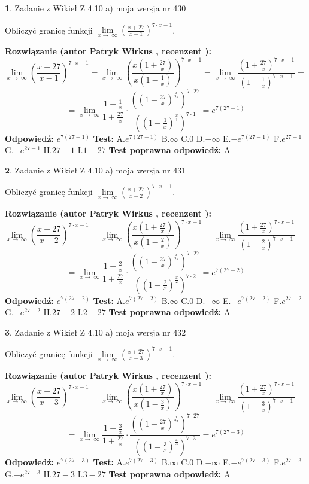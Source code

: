 \documentclass[12pt, a4paper]{article}
\theoremstyle{definition} %
\newtheorem{zad}{}
\newcommand{\zadStart}[1]{\begin{zad}#1\newline}
\newcommand{\zadStop}{\end{zad}}
\newcommand{\rozwStart}[2]{\noindent \textbf{Rozwiązanie (autor #1 , recenzent #2): }\newline}
\newcommand{\rozwStop}{\newline}
\newcommand{\odpStart}{\noindent \textbf{Odpowiedź:}\newline}
\newcommand{\odpStop}{\newline}
\newcommand{\testStart}{\noindent \textbf{Test:}\newline}
\newcommand{\testStop}{\newline}
\newcommand{\kluczStart}{\noindent \textbf{Test poprawna odpowiedź:}\newline}
\newcommand{\kluczStop}{\newline}
\begin{document}
\zadStart{Zadanie z Wikieł Z 4.10 a) moja wersja nr 430}


Obliczyć granicę funkcji  $\lim\limits_{x\to\ \infty}(\frac{x+27}{x-1})^{7\cdot x-1}$.
\zadStop
\rozwStart{Patryk Wirkus}{}
$$\lim\limits_{x\to\ \infty}(\frac{x+27}{x-1})^{7\cdot x-1} = \lim\limits_{x\to\ \infty}(\frac{x(1+\frac{27}{x})}{x(1-\frac{1}{x})})^{7\cdot x-1}=\lim\limits_{x\to\ \infty}\frac{(1+\frac{27}{x})^{7\cdot x-1}}{(1-\frac{1}{x})^{7\cdot x-1}}=$$
$$=\lim\limits_{x\to\ \infty}\frac{1-\frac{1}{x}}{1+\frac{27}{x}}\cdot\frac{((1+\frac{27}{x})^{\frac{x}{27}})^{7\cdot27}}{((1-\frac{1}{x})^{\frac{x}{1}})^{7\cdot1}}=e^{7(27-1)}$$
\rozwStop
\odpStart
$e^{7(27-1)}$
\odpStop
\testStart
A.$e^{7(27-1)}$ B.$\infty$ C.$0$ D.$-\infty$ E.$-e^{7(27-1)}$
F.$e^{27-1}$ G.$-e^{27-1}$
H.$27-1$
I.$1-27$
\testStop
\kluczStart
A
\kluczStop



\zadStart{Zadanie z Wikieł Z 4.10 a) moja wersja nr 431}


Obliczyć granicę funkcji  $\lim\limits_{x\to\ \infty}(\frac{x+27}{x-2})^{7\cdot x-1}$.
\zadStop
\rozwStart{Patryk Wirkus}{}
$$\lim\limits_{x\to\ \infty}(\frac{x+27}{x-2})^{7\cdot x-1} = \lim\limits_{x\to\ \infty}(\frac{x(1+\frac{27}{x})}{x(1-\frac{2}{x})})^{7\cdot x-1}=\lim\limits_{x\to\ \infty}\frac{(1+\frac{27}{x})^{7\cdot x-1}}{(1-\frac{2}{x})^{7\cdot x-1}}=$$
$$=\lim\limits_{x\to\ \infty}\frac{1-\frac{2}{x}}{1+\frac{27}{x}}\cdot\frac{((1+\frac{27}{x})^{\frac{x}{27}})^{7\cdot27}}{((1-\frac{2}{x})^{\frac{x}{2}})^{7\cdot2}}=e^{7(27-2)}$$
\rozwStop
\odpStart
$e^{7(27-2)}$
\odpStop
\testStart
A.$e^{7(27-2)}$ B.$\infty$ C.$0$ D.$-\infty$ E.$-e^{7(27-2)}$
F.$e^{27-2}$ G.$-e^{27-2}$
H.$27-2$
I.$2-27$
\testStop
\kluczStart
A
\kluczStop



\zadStart{Zadanie z Wikieł Z 4.10 a) moja wersja nr 432}


Obliczyć granicę funkcji  $\lim\limits_{x\to\ \infty}(\frac{x+27}{x-3})^{7\cdot x-1}$.
\zadStop
\rozwStart{Patryk Wirkus}{}
$$\lim\limits_{x\to\ \infty}(\frac{x+27}{x-3})^{7\cdot x-1} = \lim\limits_{x\to\ \infty}(\frac{x(1+\frac{27}{x})}{x(1-\frac{3}{x})})^{7\cdot x-1}=\lim\limits_{x\to\ \infty}\frac{(1+\frac{27}{x})^{7\cdot x-1}}{(1-\frac{3}{x})^{7\cdot x-1}}=$$
$$=\lim\limits_{x\to\ \infty}\frac{1-\frac{3}{x}}{1+\frac{27}{x}}\cdot\frac{((1+\frac{27}{x})^{\frac{x}{27}})^{7\cdot27}}{((1-\frac{3}{x})^{\frac{x}{3}})^{7\cdot3}}=e^{7(27-3)}$$
\rozwStop
\odpStart
$e^{7(27-3)}$
\odpStop
\testStart
A.$e^{7(27-3)}$ B.$\infty$ C.$0$ D.$-\infty$ E.$-e^{7(27-3)}$
F.$e^{27-3}$ G.$-e^{27-3}$
H.$27-3$
I.$3-27$
\testStop
\kluczStart
A
\kluczStop
\end{document}
